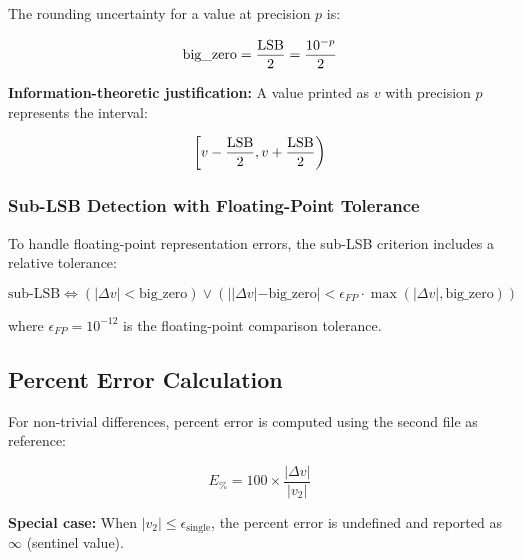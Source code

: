 The rounding uncertainty for a value at precision $p$ is:

\begin{equation}
    \text{big\_zero} = \frac{\mathrm{LSB}}{2} = \frac{10^{-p}}{2}
\end{equation}

\textbf{Information-theoretic justification:} A value printed as $v$ with precision $p$ represents the interval:

\begin{equation}
    \left[v - \frac{\mathrm{LSB}}{2}, v + \frac{\mathrm{LSB}}{2}\right)
\end{equation}

\subsubsection{Sub-LSB Detection with Floating-Point Tolerance}

To handle floating-point representation errors, the sub-LSB criterion includes a relative tolerance:

\begin{equation}
    \text{sub-LSB} \iff \left(|\Delta v| < \text{big\_zero}\right) \vee \left(||\Delta v| - \text{big\_zero}| < \epsilon_{FP} \cdot \max(|\Delta v|, \text{big\_zero})\right)
\end{equation}

where $\epsilon_{FP} = 10^{-12}$ is the floating-point comparison tolerance.

\subsection{Percent Error Calculation}

For non-trivial differences, percent error is computed using the second file as reference:

\begin{equation}
    E_{\%} = 100 \times \frac{|\Delta v|}{|v_2|}
\end{equation}

\textbf{Special case:} When $|v_2| \leq \epsilon_{\text{single}}$, the percent error is undefined and reported as $\infty$ (sentinel value).
